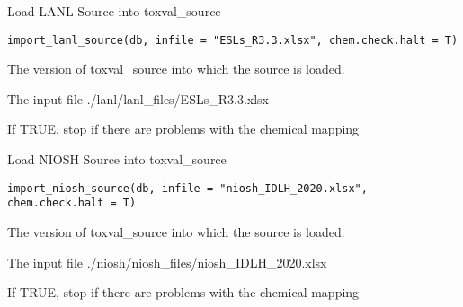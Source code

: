 \documentclass[letterpaper]{book}
\begin{document}
%
\begin{Description}\relax
Load LANL Source into toxval\_source
\end{Description}
%
\begin{Usage}
\begin{verbatim}
import_lanl_source(db, infile = "ESLs_R3.3.xlsx", chem.check.halt = T)
\end{verbatim}
\end{Usage}
%
\begin{Arguments}
\begin{ldescription}
\item[\code{db}] The version of toxval\_source into which the source is loaded.

\item[\code{infile}] The input file ./lanl/lanl\_files/ESLs\_R3.3.xlsx

\item[\code{chem.check.halt}] If TRUE, stop if there are problems with the chemical mapping
\end{ldescription}
\end{Arguments}
%
\begin{Description}\relax
Load NIOSH Source into toxval\_source
\end{Description}
%
\begin{Usage}
\begin{verbatim}
import_niosh_source(db, infile = "niosh_IDLH_2020.xlsx", chem.check.halt = T)
\end{verbatim}
\end{Usage}
%
\begin{Arguments}
\begin{ldescription}
\item[\code{db}] The version of toxval\_source into which the source is loaded.

\item[\code{infile}] The input file ./niosh/niosh\_files/niosh\_IDLH\_2020.xlsx

\item[\code{chem.check.halt}] If TRUE, stop if there are problems with the chemical mapping
\end{ldescription}
\end{Arguments}
\end{document}
